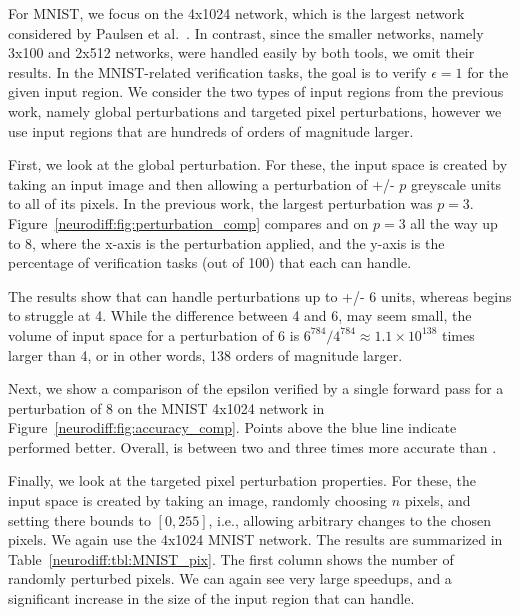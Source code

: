 For MNIST, we focus on the 4x1024 network, which is the largest
network considered by Paulsen et al.~\cite{paulsen2020reludiff}.  In contrast,
since the smaller networks, namely 3x100 and 2x512 networks, were
handled easily by both tools, we omit their results.
%
In the MNIST-related verification tasks, the goal is to verify
$ \epsilon = 1 $ for the given input region. We consider the two types
of input regions from the previous work, namely global perturbations
and targeted pixel perturbations, however we use input regions that
are hundreds of orders of magnitude larger.

First, we look at the global perturbation. For these, the input space
is created by taking an input image and then allowing a perturbation
of +/- $ p $ greyscale units to all of its pixels. In the previous
work, the largest perturbation was $ p = 3$.
%
Figure~\ref{neurodiff:fig:perturbation_comp} compares \Name{} and \ReluDiffP{}
on $ p = 3 $ all the way up to 8, where the x-axis is the perturbation
applied, and the y-axis is the percentage of verification tasks (out
of 100) that each can handle.


The results show that \Name{} can handle perturbations up to +/-
6 units, whereas \ReluDiffP{} begins to struggle at 4. While the
difference between 4 and 6, may seem small, the volume of input space
for a perturbation of 6 is $ 6^{784}/4^{784} \approx 1.1 \times
10^{138} $ times larger than 4, or in other words, 138 orders of
magnitude larger.


Next, we show a comparison of the epsilon verified by a single forward pass
for a perturbation of 8 on the MNIST 4x1024 network in
Figure~\ref{neurodiff:fig:accuracy_comp}.
Points above the blue line indicate \Name{} performed
better. Overall, \Name{} is between two and three times more accurate
than \ReluDiffP{}.

Finally, we look at the targeted pixel perturbation properties. For
these, the input space is created by taking an image, randomly
choosing $ n $ pixels, and setting there bounds to $ [0,255] $, i.e.,
allowing arbitrary changes to the chosen pixels. We again use the
4x1024 MNIST network. The results are summarized in
Table~\ref{neurodiff:tbl:MNIST_pix}. The first column shows the number of
randomly perturbed pixels. We can again see very large speedups, and a
significant increase in the size of the input region that \Name{} can
handle.


